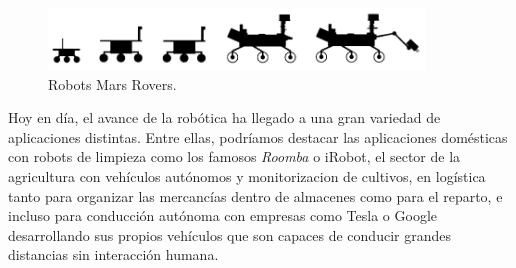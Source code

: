 \begin{figure} [H]
  \begin{center}
    \includegraphics[width=10cm]{figs/c1/rovers.png}
  \end{center}
  \caption[Robots Mars Rovers]{Robots Mars Rovers.}
  \label{fig:rovers_mars}
\end{figure}

Hoy en día, el avance de la robótica ha llegado a una gran variedad de aplicaciones distintas. Entre ellas, podríamos destacar las aplicaciones domésticas
con robots de limpieza como los famosos \textit{Roomba} o iRobot, el sector de la agricultura con vehículos autónomos y monitorizacion de cultivos,
en logística tanto para organizar las mercancías dentro de almacenes como para el reparto, e incluso para conducción autónoma con empresas como Tesla o
Google desarrollando sus propios vehículos que son capaces de conducir grandes distancias sin interacción humana.

